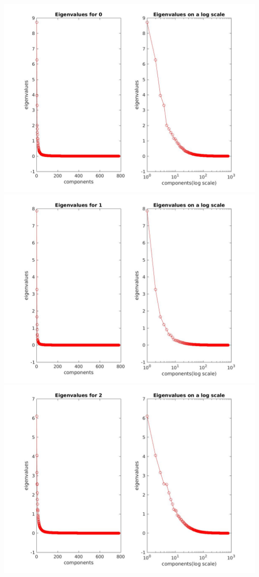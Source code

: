 \documentclass[12pt, a4paper]{article}
\begin{document}
\includegraphics[width=\textwidth, height = 0.25\paperheight]{Eigen_0}
\includegraphics[width=\textwidth, height = 0.25\paperheight]{Eigen_1}
\includegraphics[width=\textwidth, height = 0.25\paperheight]{Eigen_2}
\end{document}

